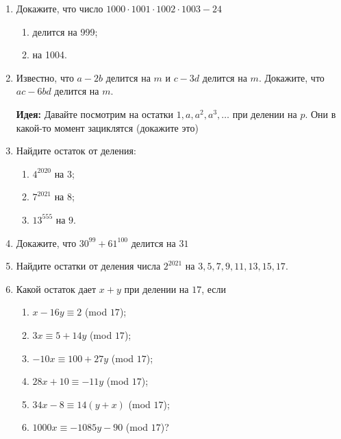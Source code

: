 \documentclass{article}
\begin{document}
\begin{enumerate}[label*=\protect\fbox{\arabic{enumi}}]
	
	\item Докажите, что число $1000 \cdot 1001 \cdot 1002 \cdot 1003 - 24$ 
	\begin{enumerate}
		\item делится  на 999;
		
		\item на 1004.
	\end{enumerate}
	
	\item Известно, что $a - 2b$ делится на $m$ и $c - 3d$ делится на $m$. Докажите, что $ac - 6bd$
	делится на $m$.
	
	\textbf{Идея:} Давайте посмотрим на остатки $1, a, a^2, a^3, \dotsc$ при делении на $p$. Они в какой-то момент зациклятся (докажите это)
	
	\item Найдите остаток от деления:
	\begin{enumerate}
		\item $4^{2020}$ на $3$;
		
		\item $7^{2021}$ на $8$;
		
		\item $13^{555}$ на $9$.
	\end{enumerate}
	
	\item Докажите, что  $30^{99} + 61^{100}$  делится на $31$
	
	\item Найдите остатки от деления числа $2^{2021}$ на $3, 5, 7, 9, 11, 13, 15, 17$.
	
	\item Какой остаток дает $x + y$ при делении на $17$, если
	\begin{enumerate}
		\item $x-16y\equiv 2$ (mod $17$);
		
		\item $3x \equiv 5+14y$ (mod $17$);
		
		\item $-10x \equiv 100+27y$ (mod $17$);
		
		\item $28x + 10\equiv -11y$ (mod $17$);
		
		\item $34x - 8\equiv 14(y + x)$ (mod $17$);
		
		\item $1000x \equiv -1085y - 90$ (mod $17$)?
	\end{enumerate}
	

\end{enumerate}
\end{document}
